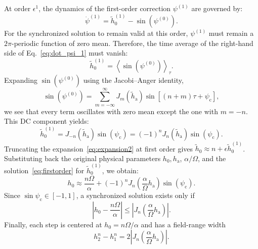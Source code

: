 \documentclass[prb,aps,twocolumn,superscriptaddress,floatfix]{revtex4-1}
\begin{document}
At order $\epsilon^1$, the dynamics of the first-order correction $\psi^{(1)}$ are governed by:
%
\begin{equation}
    \dot{\psi}^{(1)} = \tilde h_0^{(1)} - \sin\left(\psi^{(0)}\right).
    \label{eq:dot_psi_1}
\end{equation}
%
For the synchronized solution to remain valid at this order, $\psi^{(1)}$ must remain a $2\pi$-periodic function of zero mean. Therefore, the time average of the right-hand side of Eq.~\eqref{eq:dot_psi_1} must vanish:
%
\begin{equation}
    \tilde h_0^{(1)} = \left\langle \sin\left(\psi^{(0)}\right) \right\rangle_\tau.
\end{equation}
%
Expanding $\sin\left(\psi^{(0)}\right)$ using the Jacobi--Anger identity,
%
\begin{equation}
    \sin\left(\psi^{(0)}\right) = \sum_{m=-\infty}^{\infty}J_{m} (\tilde h_\text{a})\sin[(n+m)\tau+\psi_\text{c}],
\end{equation}
%
we see that every term oscillates with zero mean except the one with $m=-n$. This DC component yields:
%
\begin{equation}
    \tilde h_0^{(1)} = J_{-n}(\tilde h_\text{a})\sin(\psi_\text{c}) = (-1)^{n}J_{n} (\tilde h_\text{a})\sin(\psi_\text{c}).
    \label{eq:firstorder}
\end{equation}
%
Truncating the expansion~\eqref{eq:expansion2} at first order gives $\tilde h_0 \approx n + \epsilon \tilde h_0^{(1)}$. Substituting back the original physical parameters $h_0, h_\text{a}$, $\alpha/\Omega$, and the solution~\eqref{eq:firstorder} for $\tilde h_0^{(1)}$, we obtain:
%
\begin{equation}
    h_{0} \approx \frac{n\Omega}{\alpha} +(-1)^{n}J_{n} \left(\frac{\alpha}{\Omega}h_\text{a}\right)\sin(\psi_\text{c}). 
\end{equation}
%
Since $\sin \psi_\text{c}\in [-1,1]$, a synchronized solution exists only if
%
\begin{equation}
    \left| h_{0} - \frac{n\Omega}{\alpha} \right| \leq \left|J_{n}\left(\frac{\alpha}{\Omega}h_\text{a}\right) \right|.
    \label{eq:walkerwithAC}
\end{equation}
%
Finally, each step is centered at $h_{0}=n\Omega/\alpha$ and has a field-range width 
%
\begin{equation}
    h^{n}_{2}-h^{n}_{1}=2 \left|  J_{n}\left(\frac{\alpha}{\Omega}h_\text{a}\right) \right|.
    \label{eq:width_steps}
\end{equation}
\end{document}

